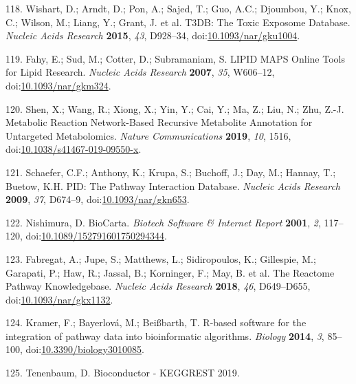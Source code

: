 \documentclass[]{article}
\begin{document}
\leavevmode\hypertarget{ref-wishart_2015}{}%
118. Wishart, D.; Arndt, D.; Pon, A.; Sajed, T.; Guo, A.C.; Djoumbou, Y.; Knox, C.; Wilson, M.; Liang, Y.; Grant, J. et al. T3DB: The Toxic Exposome Database. \emph{Nucleic Acids Research} \textbf{2015}, \emph{43}, D928--34, doi:\href{https://doi.org/10.1093/nar/gku1004}{10.1093/nar/gku1004}.

\leavevmode\hypertarget{ref-fahy_2007}{}%
119. Fahy, E.; Sud, M.; Cotter, D.; Subramaniam, S. LIPID MAPS Online Tools for Lipid Research. \emph{Nucleic Acids Research} \textbf{2007}, \emph{35}, W606--12, doi:\href{https://doi.org/10.1093/nar/gkm324}{10.1093/nar/gkm324}.

\leavevmode\hypertarget{ref-shen_2019}{}%
120. Shen, X.; Wang, R.; Xiong, X.; Yin, Y.; Cai, Y.; Ma, Z.; Liu, N.; Zhu, Z.-J. Metabolic Reaction Network-Based Recursive Metabolite Annotation for Untargeted Metabolomics. \emph{Nature Communications} \textbf{2019}, \emph{10}, 1516, doi:\href{https://doi.org/10.1038/s41467-019-09550-x}{10.1038/s41467-019-09550-x}.

\leavevmode\hypertarget{ref-schaefer_2009}{}%
121. Schaefer, C.F.; Anthony, K.; Krupa, S.; Buchoff, J.; Day, M.; Hannay, T.; Buetow, K.H. PID: The Pathway Interaction Database. \emph{Nucleic Acids Research} \textbf{2009}, \emph{37}, D674--9, doi:\href{https://doi.org/10.1093/nar/gkn653}{10.1093/nar/gkn653}.

\leavevmode\hypertarget{ref-nishimura_2001}{}%
122. Nishimura, D. BioCarta. \emph{Biotech Software \& Internet Report} \textbf{2001}, \emph{2}, 117--120, doi:\href{https://doi.org/10.1089/152791601750294344}{10.1089/152791601750294344}.

\leavevmode\hypertarget{ref-fabregat_2018}{}%
123. Fabregat, A.; Jupe, S.; Matthews, L.; Sidiropoulos, K.; Gillespie, M.; Garapati, P.; Haw, R.; Jassal, B.; Korninger, F.; May, B. et al. The Reactome Pathway Knowledgebase. \emph{Nucleic Acids Research} \textbf{2018}, \emph{46}, D649--D655, doi:\href{https://doi.org/10.1093/nar/gkx1132}{10.1093/nar/gkx1132}.

\leavevmode\hypertarget{ref-kramer_2014}{}%
124. Kramer, F.; Bayerlová, M.; Beißbarth, T. R-based software for the integration of pathway data into bioinformatic algorithms. \emph{Biology} \textbf{2014}, \emph{3}, 85--100, doi:\href{https://doi.org/10.3390/biology3010085}{10.3390/biology3010085}.

\leavevmode\hypertarget{ref-tenenbaum_website_2019}{}%
125. Tenenbaum, D. Bioconductor - KEGGREST 2019.
\end{document}
